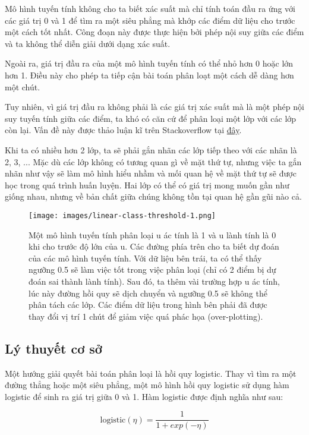Mô hình tuyến tính không cho ta biết xác suất mà chỉ tính toán đầu ra ứng với các giá trị 0 và 1 để tìm ra một siêu phẳng mà khớp các điểm dữ liệu cho trước một cách tốt nhất. Công đoạn này được thực hiện bởi phép nội suy giữa các điểm và ta không thể diễn giải dưới dạng xác suất.

Ngoài ra, giá trị đầu ra của một mô hình tuyến tính có thể nhỏ hơn 0 hoặc lớn hơn 1. Điều này cho phép ta tiếp cận bài toán phân loạt một cách dễ dàng hơn một chút.

Tuy nhiên, vì giá trị đầu ra không phải là các giá trị xác suất mà là một phép nội suy tuyến tính giữa các điểm, ta khó có căn cứ để phân loại một lớp với các lớp còn lại. Vấn đề này được thảo luận kĩ trên Stackoverflow tại \href{https://stats.stackexchange.com/questions/22381/why-not-approach-classification-through-regression}{đây}.

Khi ta có nhiều hơn 2 lớp, ta sẽ phải gắn nhãn các lớp tiếp theo với các nhãn là 2, 3, ... Mặc dù các lớp không có tương quan gì về mặt thứ tự, nhưng việc ta gắn nhãn như vậy sẽ làm mô hình hiểu nhầm và mối quan hệ về mặt thứ tự sẽ được học trong quá trình huấn luyện. Hai lớp có thể có giá trị mong muốn gần như giống nhau, nhưng về bản chất giữa chúng không tồn tại quan hệ gần gũi nào cả. 

\begin{figure*}[h!]
	\centering
	\texttt{[image: images/linear-class-threshold-1.png]}
	\label{fig:4_2}
	\caption{Một mô hình tuyến tính phân loại u ác tính là 1 và u lành tính là 0 khi cho trước độ lớn của u. Các đường phía trên cho ta biết dự đoán của các mô hình tuyến tính. Với dữ liệu bên trái, ta có thể thấy ngưỡng 0.5 sẽ làm việc tốt trong việc phân loại (chỉ có 2 điểm bị dự đoán sai thành lành tính). Sau đó, ta thêm vài trường hợp u ác tính, lúc này đường hồi quy sẽ dịch chuyển và ngưỡng 0.5 sẽ không thể phân tách các lớp. Các điểm dữ liệu trong hình bên phải đã được thay đổi vị trí 1 chút để giảm việc quá phác họa (over-plotting). }
\end{figure*}

\subsection{Lý thuyết cơ sở}
Một hướng giải quyết bài toán phân loại là hồi quy logistic. Thay vì tìm ra một đường thẳng hoặc một siêu phẳng, một mô hình hồi quy logistic sử dụng hàm logistic để sinh ra giá trị giữa 0 và 1. Hàm logistic được định nghĩa như sau:

$$\text{logistic}(\eta)=\frac{1}{1+exp(-\eta)}$$

